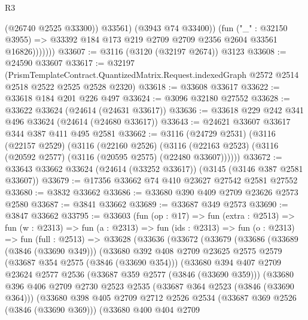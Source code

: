 \begin{lexlean}{R3}
\begin{coremodule}
                      (@26740 @2525 @33300))
                    @33561)
                  (@3943 @74 @33400))
                (fun ("_" : @32150 @3955) =>
                @33392 @184 @173 @219 @2709 @2709 @2356 @2604 @33561 @16826)))))))
@33607 := @3116 (@3120 (@32197 @2674)) @3123
@33608 := @24590 @33607
@33617 := @32197
    (PrismTemplateContract.QuantizedMatrix.Request.indexedGraph
      @2572
      @2514
      @2518
      @2522
      @2525
      @2528
      @2320)
@33618 := @33608 @33617
@33622 := @33618 @184 @201 @226 @497
@33624 := @3096 @32180 @27552
@33628 := @33622 @33624 (@24614 (@24631 @33617))
@33636 := @33618 @229 @242 @341 @496 @33624 (@24614 (@24680 @33617))
@33643 := @24621 @33607 @33617 @344 @387 @411 @495 @2581
@33662 := @3116
    (@24729 @2531)
    (@3116
      (@22157 @2529)
      (@3116
        (@22160 @2526)
        (@3116 (@22163 @2523) (@3116 (@20592 @2577) (@3116 (@20595 @2575) (@22480 @33607))))))
@33672 := @33643 @33662 @33624 (@24614 (@33252 @33617)) (@3145 (@3146 @387 @2581 @33607))
@33679 := @17356 @33662 @74 @410 @23627 @27542 @2581 @27552
@33680 := @3832 @33662
@33686 := @33680 @390 @409 @2709 @23626 @2573 @2580
@33687 := @3841 @33662
@33689 := @33687 @349 @2573
@33690 := @3847 @33662
@33795 := @33603
    (fun (op : @17) =>
    fun (extra : @2513) =>
    fun (w : @2313) =>
    fun (a : @2313) =>
    fun (ids : @2313) =>
    fun (o : @2313) =>
    fun (full : @2513) =>
    @33628
      (@33636
        (@33672
          (@33679
            (@33686
              (@33689 (@3846 (@33690 @349)))
              (@33680
                @392
                @408
                @2709
                @23625
                @2575
                @2579
                (@33687 @354 @2575 (@3846 (@33690 @354)))
                (@33680
                  @394
                  @407
                  @2709
                  @23624
                  @2577
                  @2536
                  (@33687 @359 @2577 (@3846 (@33690 @359)))
                  (@33680
                    @396
                    @406
                    @2709
                    @2730
                    @2523
                    @2535
                    (@33687 @364 @2523 (@3846 (@33690 @364)))
                    (@33680
                      @398
                      @405
                      @2709
                      @2712
                      @2526
                      @2534
                      (@33687 @369 @2526 (@3846 (@33690 @369)))
                      (@33680
                        @400
                        @404
                        @2709

\end{coremodule}
\end{lexlean}
